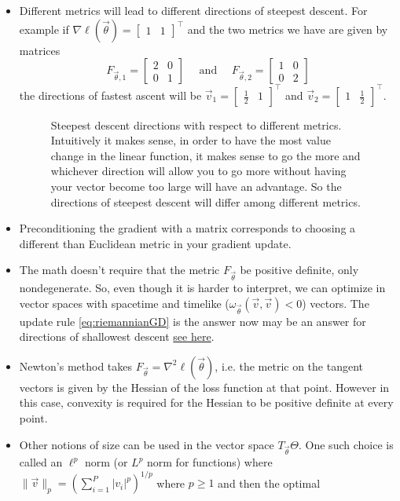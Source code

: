 \documentclass[12pt]{amsart}
\begin{document}
\begin{itemize}
\item Different metrics will lead to different directions of steepest descent. For example if $\nabla\ell(\vec{\theta}) = \begin{bmatrix}
1 & 1
\end{bmatrix}^\top$ and the two metrics we have are given by matrices 
\[
	F_{\vec{\theta},1} = \begin{bmatrix}
	2& 0\\ 0&1
	\end{bmatrix}
	\quad \text{ and } \quad
	F_{\vec{\theta},2} = \begin{bmatrix}
	1&0\\0&2
	\end{bmatrix}
\]
the directions of fastest ascent will be $\vec{v}_1 = \begin{bmatrix}
\tfrac{1}{2}  & 1
\end{bmatrix}^\top$ and $\vec{v}_2 = \begin{bmatrix}
1& \tfrac12
\end{bmatrix}^\top$. 
\begin{figure}[ht!]

\caption*{Steepest descent directions with respect to different metrics. Intuitively it makes sense, in order to have the most value change in the linear function, it makes sense to go the more and whichever direction will allow you to go more without having your vector become too large will have an advantage. So the directions of steepest descent will differ among different metrics.}
\end{figure}
\item Preconditioning the gradient with a matrix corresponds to choosing a different than Euclidean metric in your gradient update.
\item The math doesn't require that the metric $F_{\vec{\theta}}$ be positive definite, only nondegenerate. So, even though it is harder to interpret, we can optimize in vector spaces with spacetime and timelike ($\omega_{\vec{\theta}}(\vec{v}, \vec{v}) <0$) vectors. The update rule \eqref{eq:riemannianGD} is the answer now may be an answer for directions of shallowest descent \href{https://arxiv.org/pdf/1812.07643}{see here}.
\item Newton's method takes $F_{\vec{\theta}} = \nabla^2 \ell(\vec{\theta})$, i.e. the metric on the tangent vectors is given by the Hessian of the loss function at that point. However in this case, convexity is required for the Hessian to be positive definite at every point.
\item Other notions of size can be used in the vector space $T_\vec{\theta} \Theta$. One such choice is called an $\ell^p$ norm (or $L^p$ norm for functions) where $\|\vec{v}\|_{p} = \left(\sum_{i = 1}^P |v_i|^p\right)^{1/p}$ where $p \geq 1$ and then the optimal 
\end{itemize}
\end{document}
